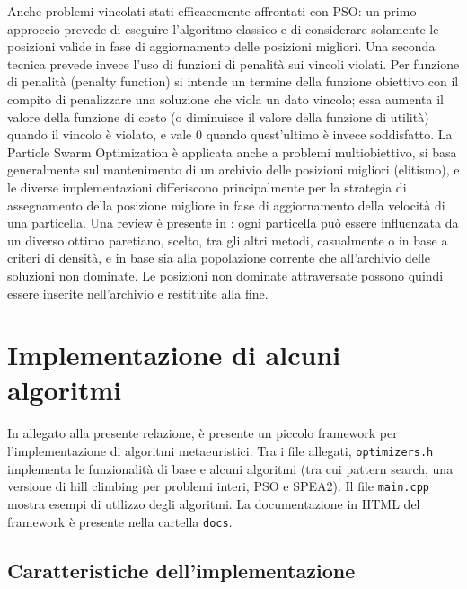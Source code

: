 \documentclass[12pt]{article}
\begin{document}
\newline
Anche problemi vincolati stati efficacemente affrontati con PSO: un primo approccio prevede di eseguire l'algoritmo classico e di considerare solamente le posizioni valide in fase di aggiornamento delle posizioni migliori. Una seconda tecnica prevede invece l'uso di funzioni di penalità sui vincoli violati. Per funzione di penalità (penalty function) si intende un termine della funzione obiettivo con il compito di penalizzare una soluzione che viola un dato vincolo; essa aumenta il valore della funzione di costo (o diminuisce il valore della funzione di utilità) quando il vincolo è violato, e vale 0 quando quest'ultimo è invece soddisfatto.\newline
\newline
La Particle Swarm Optimization è applicata anche a problemi multiobiettivo, si basa generalmente sul mantenimento di un archivio delle posizioni migliori (elitismo), e le diverse implementazioni differiscono principalmente per la strategia di assegnamento della posizione migliore in fase di aggiornamento della velocità di una particella. Una review è presente in \cite{HuYen2015}: ogni particella può essere influenzata da un diverso ottimo paretiano, scelto, tra gli altri metodi, casualmente o in base a criteri di densità, e in base sia alla popolazione corrente che all'archivio delle soluzioni non dominate. Le posizioni non dominate attraversate possono quindi essere inserite nell'archivio e restituite alla fine.

\section*{\hfil Implementazione di alcuni algoritmi \hfil}

In allegato alla presente relazione, è presente un piccolo framework per l'implementazione di algoritmi metaeuristici. Tra i file allegati, \texttt{optimizers.h} implementa le funzionalità di base e alcuni algoritmi (tra cui pattern search, una versione di hill climbing per problemi interi, PSO e SPEA2). Il file \texttt{main.cpp} mostra esempi di utilizzo degli algoritmi. La documentazione in HTML del framework è presente nella cartella \texttt{docs}.

\subsection*{Caratteristiche dell'implementazione}
\end{document}
